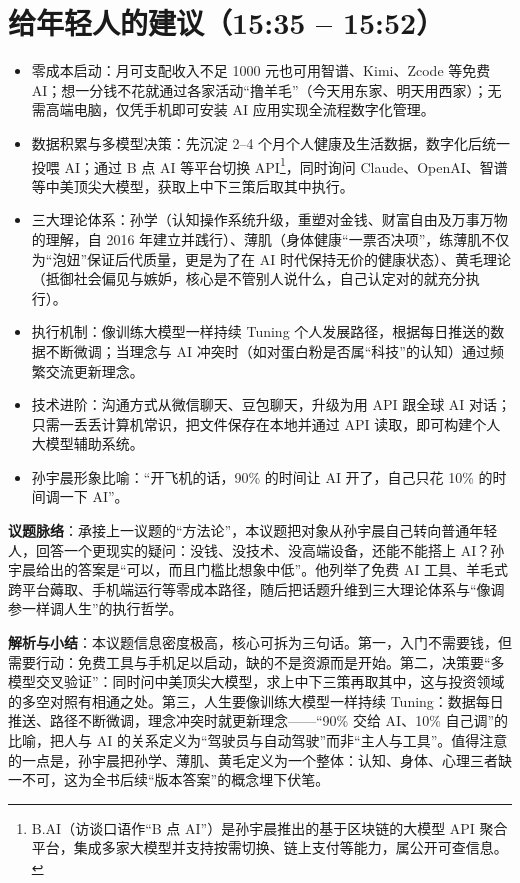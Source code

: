 \section{给年轻人的建议（15:35 --
15:52）}

\begin{itemize}
\tightlist
\item
  零成本启动：月可支配收入不足 1000 元也可用智谱、Kimi、Zcode 等免费
  AI；想一分钱不花就通过各家活动``撸羊毛''（今天用东家、明天用西家）；无需高端电脑，仅凭手机即可安装
  AI 应用实现全流程数字化管理。
\item
  数据积累与多模型决策：先沉淀 2--4
  个月个人健康及生活数据，数字化后统一投喂 AI；通过 B 点 AI 等平台切换
  API\footnote{B.AI（访谈口语作``B 点
    AI''）是孙宇晨推出的基于区块链的大模型 API
    聚合平台，集成多家大模型并支持按需切换、链上支付等能力，属公开可查信息。}，同时询问
  Claude、OpenAI、智谱等中美顶尖大模型，获取上中下三策后取其中执行。
\item
  三大理论体系：孙学（认知操作系统升级，重塑对金钱、财富自由及万事万物的理解，自
  2016
  年建立并践行）、薄肌（身体健康``一票否决项''，练薄肌不仅为``泡妞''保证后代质量，更是为了在
  AI
  时代保持无价的健康状态）、黄毛理论（抵御社会偏见与嫉妒，核心是不管别人说什么，自己认定对的就充分执行）。
\item
  执行机制：像训练大模型一样持续 Tuning
  个人发展路径，根据每日推送的数据不断微调；当理念与 AI
  冲突时（如对蛋白粉是否属``科技''的认知）通过频繁交流更新理念。
\item
  技术进阶：沟通方式从微信聊天、豆包聊天，升级为用 API 跟全球 AI
  对话；只需一丢丢计算机常识，把文件保存在本地并通过 API
  读取，即可构建个人大模型辅助系统。
\item
  孙宇晨形象比喻：``开飞机的话，90\% 的时间让 AI 开了，自己只花 10\%
  的时间调一下 AI''。
\end{itemize}

\textbf{议题脉络}：承接上一议题的``方法论''，本议题把对象从孙宇晨自己转向普通年轻人，回答一个更现实的疑问：没钱、没技术、没高端设备，还能不能搭上
AI？孙宇晨给出的答案是``可以，而且门槛比想象中低''。他列举了免费 AI
工具、羊毛式跨平台薅取、手机端运行等零成本路径，随后把话题升维到三大理论体系与``像调参一样调人生''的执行哲学。

\textbf{解析与小结}：本议题信息密度极高，核心可拆为三句话。第一，入门不需要钱，但需要行动：免费工具与手机足以启动，缺的不是资源而是开始。第二，决策要``多模型交叉验证''：同时问中美顶尖大模型，求上中下三策再取其中，这与投资领域的多空对照有相通之处。第三，人生要像训练大模型一样持续
Tuning：数据每日推送、路径不断微调，理念冲突时就更新理念------``90\%
交给 AI、10\% 自己调''的比喻，把人与 AI
的关系定义为``驾驶员与自动驾驶''而非``主人与工具''。值得注意的一点是，孙宇晨把孙学、薄肌、黄毛定义为一个整体：认知、身体、心理三者缺一不可，这为全书后续``版本答案''的概念埋下伏笔。

